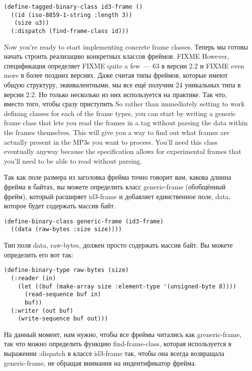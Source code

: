 \begin{lstlisting}
(define-tagged-binary-class id3-frame ()
  ((id (iso-8859-1-string :length 3))
   (size u3))
  (:dispatch (find-frame-class id)))
\end{lstlisting}

Now you're ready to start implementing concrete frame classes.  Теперь мы готовы начать
строить реализацию конкретных классов фреймов.  FIXME However, спецификация определяет
FIXME quite a few~--- 63 в версии 2.2 и FIXME even more в более поздних версиях.  Даже
считая типы фреймов, которые имеют общую структуру, эквивалентными, мы все ещё получим 24
уникальных типа в версии 2.2.  Но только несколько из них используется на практике.  Так
что, вместо того, чтобы сразу приступить So rather than immediately setting to work
defining classes for each of the frame types, you can start by writing a generic frame
class that lets you read the frames in a tag without parsing the data within the frames
themselves. This will give you a way to find out what frames are actually present in the
MP3s you want to process. You'll need this class eventually anyway because the
specification allows for experimental frames that you'll need to be able to read without
parsing.

Так как поле размера из заголовка фрейма точно говорит вам, какова длинна фрейма в байтах,
вы можете определить класс generic-frame (обобщённый фрейм), который расширяет id3-frame и
добавляет единственное поле, data, которое будет содержать массив байт.

\begin{lstlisting}
(define-binary-class generic-frame (id3-frame)
  ((data (raw-bytes :size size))))
\end{lstlisting}

Тип поля data, raw-bytes, должен просто содержать массив байт. Вы можете определить его
вот так:

\begin{lstlisting}
(define-binary-type raw-bytes (size)
  (:reader (in)
    (let ((buf (make-array size :element-type '(unsigned-byte 8))))
      (read-sequence buf in)
      buf))
  (:writer (out buf)
    (write-sequence buf out)))
\end{lstlisting}

На данный момент, нам нужно, чтобы все фреймы читались как greneric-frame, так что можно
определить функцию find-frame-class, которая используется в выражении :dispatch в классе
id3-frame так, чтобы она всегда возвращала generic-frame, не обращая внимания на
индентификатор фрейма.

